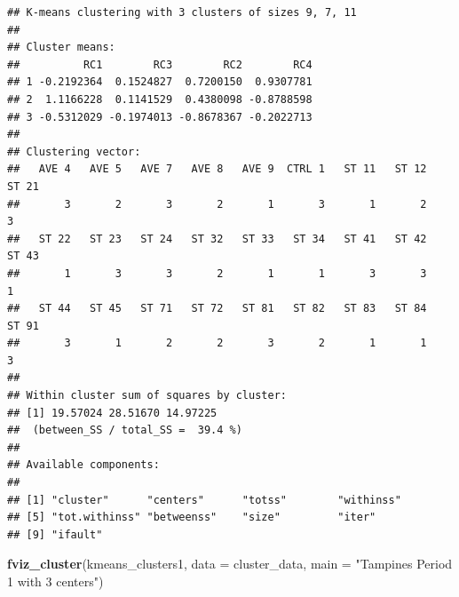 \documentclass[]{book}
\newenvironment{Shaded}{\begin{snugshade}}{\end{snugshade}}
\newcommand{\KeywordTok}[1]{\textcolor[rgb]{0.13,0.29,0.53}{\textbf{#1}}}
\newcommand{\DataTypeTok}[1]{\textcolor[rgb]{0.13,0.29,0.53}{#1}}
\newcommand{\StringTok}[1]{\textcolor[rgb]{0.31,0.60,0.02}{#1}}
\newcommand{\NormalTok}[1]{#1}
\begin{document}
\begin{verbatim}
## K-means clustering with 3 clusters of sizes 9, 7, 11
## 
## Cluster means:
##          RC1        RC3        RC2        RC4
## 1 -0.2192364  0.1524827  0.7200150  0.9307781
## 2  1.1166228  0.1141529  0.4380098 -0.8788598
## 3 -0.5312029 -0.1974013 -0.8678367 -0.2022713
## 
## Clustering vector:
##   AVE 4   AVE 5   AVE 7   AVE 8   AVE 9  CTRL 1   ST 11   ST 12   ST 21 
##       3       2       3       2       1       3       1       2       3 
##   ST 22   ST 23   ST 24   ST 32   ST 33   ST 34   ST 41   ST 42   ST 43 
##       1       3       3       2       1       1       3       3       1 
##   ST 44   ST 45   ST 71   ST 72   ST 81   ST 82   ST 83   ST 84   ST 91 
##       3       1       2       2       3       2       1       1       3 
## 
## Within cluster sum of squares by cluster:
## [1] 19.57024 28.51670 14.97225
##  (between_SS / total_SS =  39.4 %)
## 
## Available components:
## 
## [1] "cluster"      "centers"      "totss"        "withinss"    
## [5] "tot.withinss" "betweenss"    "size"         "iter"        
## [9] "ifault"
\end{verbatim}

\begin{Shaded}
\begin{Highlighting}[]
\KeywordTok{fviz_cluster}\NormalTok{(kmeans_clusters1, }\DataTypeTok{data =}\NormalTok{ cluster_data, }\DataTypeTok{main =} \StringTok{"Tampines Period 1 with 3 centers"}\NormalTok{)}
\end{Highlighting}
\end{Shaded}
\end{document}
